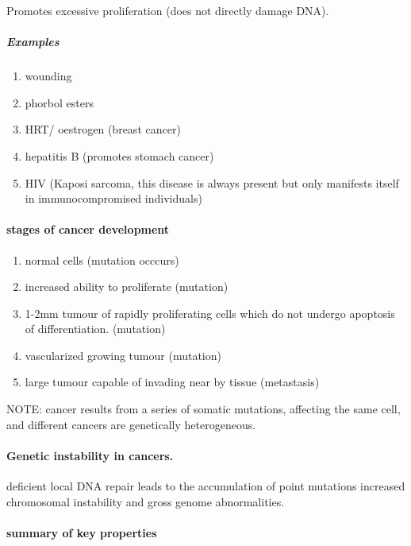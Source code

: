 \documentclass[]{article}
\providecommand{\tightlist}{%
  \setlength{\itemsep}{0pt}\setlength{\parskip}{0pt}}
\let\oldparagraph\paragraph
\renewcommand{\paragraph}[1]{\oldparagraph{#1}\mbox{}}
\let\oldsubparagraph\subparagraph
\renewcommand{\subparagraph}[1]{\oldsubparagraph{#1}\mbox{}}
\begin{document}
Promotes excessive proliferation (does not directly damage DNA).

\hypertarget{examples}{%
\subparagraph{Examples}\label{examples}}

\begin{enumerate}
\def\labelenumi{\arabic{enumi}.}
\tightlist
\item
  wounding
\item
  phorbol esters
\item
  HRT/ oestrogen (breast cancer)
\item
  hepatitis B (promotes stomach cancer)
\item
  HIV (Kaposi sarcoma, this disease is always present but only manifests
  itself in immunocompromised individuals)
\end{enumerate}

\hypertarget{stages-of-cancer-development}{%
\paragraph{stages of cancer
development}\label{stages-of-cancer-development}}

\begin{enumerate}
\def\labelenumi{\arabic{enumi}.}
\tightlist
\item
  normal cells (mutation occcurs)
\item
  increased ability to proliferate (mutation)
\item
  1-2mm tumour of rapidly proliferating cells which do not undergo
  apoptosis of differentiation. (mutation)
\item
  vascularized growing tumour (mutation)
\item
  large tumour capable of invading near by tissue (metastasis)
\end{enumerate}

NOTE: cancer results from a series of somatic mutations, affecting the
same cell, and different cancers are genetically heterogeneous.

\hypertarget{genetic-instability-in-cancers.}{%
\paragraph{Genetic instability in
cancers.}\label{genetic-instability-in-cancers.}}

deficient local DNA repair leads to the accumulation of point mutations
increased chromosomal instability and gross genome abnormalities.

\hypertarget{summary-of-key-properties}{%
\paragraph{summary of key properties}\label{summary-of-key-properties}}
\end{document}

